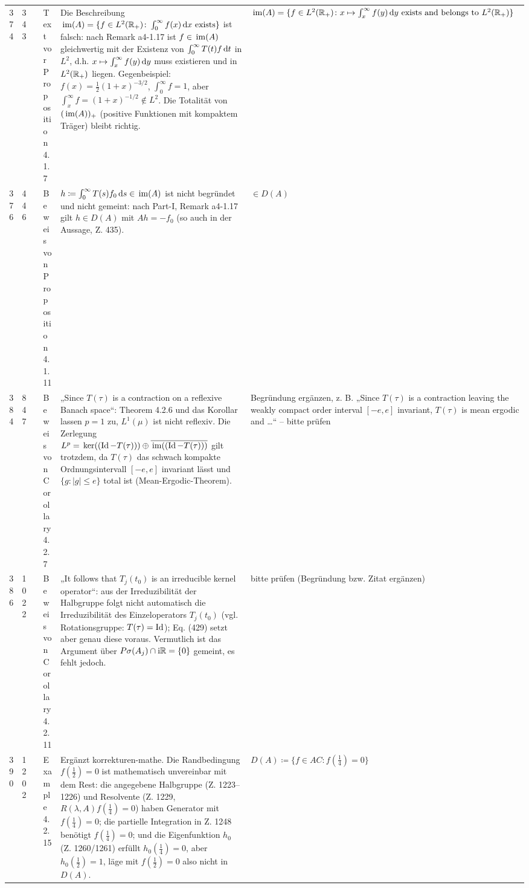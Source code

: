 \documentclass[10pt]{article}
\begin{document}
\begin{longtable}{@{}rrc>{\RaggedRight\arraybackslash}p{3.0cm}>{\RaggedRight\arraybackslash}p{11.4cm}>{\RaggedRight\arraybackslash}p{7.4cm}@{}}
374 & 343 & \sichB{} & Text vor Proposition 4.1.7 & Die Beschreibung $\mathop{}\mathrm{im}(A) = \{f \in L^{2}(\mathbb{R}_{+}) \colon \int_{0}^{\infty} f(x)\mathop{}\!\mathrm{d}{x} \text{ exists}\}$ ist falsch: nach Remark a4-1.17 ist $f \in \mathop{}\mathrm{im}(A)$ gleichwertig mit der Existenz von $\int_0^\infty T(t)f\mathop{}\!\mathrm{d}{t}$ in $L^2$, d.h. $x \mapsto \int_x^\infty f(y)\mathop{}\!\mathrm{d}{y}$ muss existieren und in $L^2(\mathbb{R}_+)$ liegen. Gegenbeispiel: $f(x) = \frac12(1+x)^{-3/2}$, $\int_0^\infty f = 1$, aber $\int_x^\infty f = (1+x)^{-1/2} \notin L^2$. Die Totalität von $(\mathop{}\mathrm{im}(A))_+$ (positive Funktionen mit kompaktem Träger) bleibt richtig. & $\mathop{}\mathrm{im}(A) = \{f \in L^{2}(\mathbb{R}_{+}) \colon x \mapsto \int_{x}^{\infty} f(y)\mathop{}\!\mathrm{d}{y} \text{ exists and belongs to } L^{2}(\mathbb{R}_{+})\}$ \\[2pt]
376 & 446 & \sichB{} & Beweis von Proposition 4.1.11 & $h \coloneq \int_{0}^{\infty} T(s)f_{0}\mathop{}\!\mathrm{d}{s} \in \mathop{}\mathrm{im}(A)$ ist nicht begründet und nicht gemeint: nach Part-I, Remark a4-1.17 gilt $h \in D(A)$ mit $Ah=-f_0$ (so auch in der Aussage, Z. 435). & $\in D(A)$ \\[2pt]
384 & 847 & \sichB{} & Beweis von Corollary 4.2.7 & „Since $T(\tau)$ is a contraction on a reflexive Banach space“: Theorem 4.2.6 und das Korollar lassen $p = 1$ zu, $L^1(\mu)$ ist nicht reflexiv. Die Zerlegung $L^p = \mathop{}\mathrm{ker}((\operatorname{Id}-T(\tau))) \oplus \overline{\mathop{}\mathrm{im}((\operatorname{Id}-T(\tau)))}$ gilt trotzdem, da $T(\tau)$ das schwach kompakte Ordnungsintervall $[-e,e]$ invariant lässt und $\{g \colon \vert g\vert \le e\}$ total ist (Mean-Ergodic-Theorem). & Begründung ergänzen, z. B. „Since $T(\tau)$ is a contraction leaving the weakly compact order interval $[-e,e]$ invariant, $T(\tau)$ is mean ergodic and \dots{}“ – bitte prüfen \\[2pt]
386 & 1022 & \sichC{} & Beweis von Corollary 4.2.11 & „It follows that $T_j(t_0)$ is an irreducible kernel operator“: aus der Irreduzibilität der Halbgruppe folgt nicht automatisch die Irreduzibilität des Einzeloperators $T_j(t_0)$ (vgl. Rotationsgruppe: $T(\tau)=\operatorname{Id}$); Eq. (429) setzt aber genau diese voraus. Vermutlich ist das Argument über $P\sigma(A_j)\cap\mathrm{i}\mathbb{R}=\{0\}$ gemeint, es fehlt jedoch. & bitte prüfen (Begründung bzw. Zitat ergänzen) \\[2pt]
390 & 1202 & \sichA{} & Example 4.2.15 & Ergänzt korrekturen-mathe. Die Randbedingung $f(\frac{1}{2}) = 0$ ist mathematisch unvereinbar mit dem Rest: die angegebene Halbgruppe (Z. 1223–1226) und Resolvente (Z. 1229, $R(\lambda,A)f(\frac14)=0$) haben Generator mit $f(\frac14)=0$; die partielle Integration in Z. 1248 benötigt $f(\frac14)=0$; und die Eigenfunktion $h_0$ (Z. 1260/1261) erfüllt $h_0(\frac14)=0$, aber $h_0(\frac12)=1$, läge mit $f(\frac12)=0$ also nicht in $D(A)$. & $D(A) \coloneq \{f \in AC \colon f(\frac{1}{4}) = 0\}$ \\[2pt]

\end{longtable}
\end{document}
